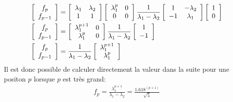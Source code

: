 \begin{align}
	\left[ \begin{array}{c}
			   f_p \\ f_{p-1}
	\end{array} \right]
	&=
	\left[ \begin{array}{c c }
			   \lambda_1 & \lambda_2 \\
			   1         & 1 \\
	\end{array} \right]
	\left[ \begin{array}{c c }
			   \lambda_1^p & 0 \\
			   0         & 0 \\
	\end{array} \right]
	\frac{1}{\lambda_1 - \lambda_2}
	\left[ \begin{array}{c c }
			   1 & -\lambda_2 \\
			   -1         & \lambda_1 \\
	\end{array} \right]
	\left[ \begin{array}{c}
			   1 \\ 0
	\end{array} \right]
	\\
	\left[ \begin{array}{c}
			   f_p \\ f_{p-1}
	\end{array} \right]
	&=
	\left[ \begin{array}{c c}
			   \lambda_1^{p+1} & 0 \\
			   \lambda_1^{p}  & 0\\
	\end{array} \right]
	\frac{1}{\lambda_1 - \lambda_2}
	\left[ \begin{array}{c }
			   1  \\
			   -1   \\
	\end{array} \right]
	\\
	\left[ \begin{array}{c}
			   f_p \\ f_{p-1}
	\end{array} \right]
	&=
	\frac{1}{\lambda_1 - \lambda_2}
	\left[ \begin{array}{c}
			   \lambda_1^{p+1}\\
			   \lambda_1^{p} \\
	\end{array} \right]
\end{align}
Il est donc possible de calculer directement la valeur dans la suite pour une positon $p$ lorsque $p$ est très grand:
\begin{align}
	f_p = \frac{\lambda_1^{p+1}}{\lambda_1 - \lambda_2} = \frac{1.618^{(p+1)}}{\sqrt{5}}
\end{align}

